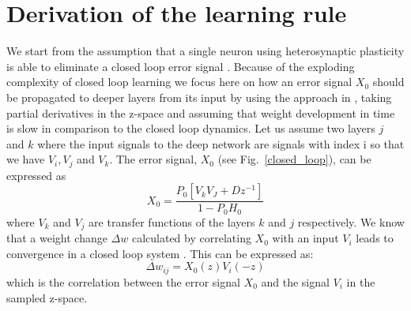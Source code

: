\documentclass[Afour,sageh,times]{sagej}
\begin{document}
\section{Derivation of the learning rule}
We start from the assumption that a single neuron using heterosynaptic
plasticity is able to eliminate a closed loop error signal
\cite{Porr2006ICO}. Because of the exploding complexity of closed loop
learning we focus here on how an error signal $X_0$ should be propagated
to deeper layers from its input by using the approach in
\cite{Mehta1986}, taking partial derivatives in the z-space and
assuming that weight development in time is slow in comparison to the
closed loop dynamics.  Let us assume two layers $j$ and $k$ where the
input signals to the deep network are signals with index i so that we
have $V_i, V_j$ and $V_k$. The error signal, $X_0$ (see
Fig.~\ref{closed_loop}), can be expressed as
\begin{equation}
  X_0 = \frac{P_0 \left[ V_k V_J + D z^{-1} \right]}{1-P_0 H_0}
\end{equation}
where $V_k$ and $V_j$ are transfer functions of the layers $k$ and $j$
respectively. We know that a weight change $\Delta w$ calculated by
correlating $X_0$ with an input $V_i$ leads to convergence in a closed
loop system \cite{Porr2006ICO}. This can be expressed as:
\begin{equation}
  \Delta w_{ij} = X_0(z) V_i(-z)
\end{equation}
which is the correlation between the error signal $X_0$ and the
signal $V_i$ in the sampled z-space.
\end{document}
